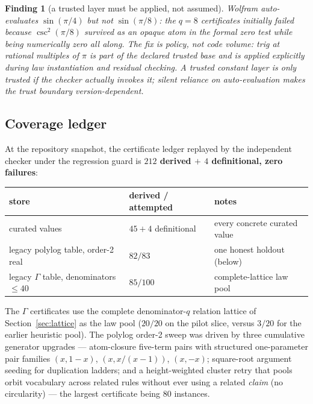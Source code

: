 \documentclass[11pt]{article}
\newtheorem{finding}[result]{Finding}
\theoremstyle{remark}
\begin{document}
\begin{finding}[a trusted layer must be applied, not assumed]\label{find:trig}
Wolfram auto-evaluates $\sin(\pi/4)$ but \emph{not} $\sin(\pi/8)$: the $q=8$ certificates
initially failed because $\csc^2(\pi/8)$ survived as an opaque atom in the formal zero
test while being numerically zero all along. The fix is policy, not code volume: trig at
rational multiples of $\pi$ is part of the declared trusted base and is applied explicitly
during law instantiation and residual checking. A trusted constant layer is only trusted
if the checker actually \emph{invokes} it; silent reliance on auto-evaluation makes the
trust boundary version-dependent.
\end{finding}

\subsection{Coverage ledger}

At the repository snapshot, the certificate ledger replayed by the independent checker
under the regression guard is \textbf{$212$ derived $+$ $4$ definitional, zero failures}:

\begin{center}
\begin{tabular}{l l l}
\toprule
store & derived / attempted & notes\\
\midrule
curated values & $45+4$ definitional & every concrete curated value\\
legacy polylog table, order-2 real & $82/83$ & one honest holdout (below)\\
legacy $\Gamma$ table, denominators $\le40$ & $85/100$ & complete-lattice law pool\\
\bottomrule
\end{tabular}
\end{center}

The $\Gamma$ certificates use the complete denominator-$q$ relation lattice of
Section~\ref{sec:lattice} as the law pool ($20/20$ on the pilot slice, versus $3/20$ for
the earlier heuristic pool). The polylog order-2 sweep was driven by three cumulative
generator upgrades --- atom-closure five-term pairs with structured one-parameter pair
families $(x,1-x)$, $(x,x/(x-1))$, $(x,-x)$; square-root argument seeding for
duplication ladders; and a height-weighted cluster retry that pools orbit vocabulary
across related rules without ever using a related \emph{claim} (no circularity) --- the
largest certificate being $80$ instances.
\end{document}
